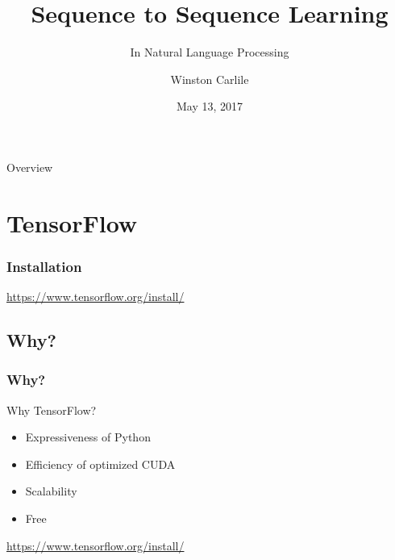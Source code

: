 \documentclass[pdf]{beamer}
\title{Sequence to Sequence Learning}
\subtitle{In Natural Language Processing}
\date{May 13, 2017}
\author{Winston Carlile}
\institute{wjc140030@utdallas.edu}
\begin{document}
\begin{frame}
  \titlepage
\end{frame}

\begin{frame}{Overview}
  \tableofcontents
\end{frame}
\section{TensorFlow}

\begin{frame}
  \frametitle{Installation}
  \url{https://www.tensorflow.org/install/}
\end{frame}

\subsection{Why?}
\begin{frame}
  \frametitle{Why?}
  Why TensorFlow?
  \begin{itemize}
  \item Expressiveness of Python
  \item Efficiency of optimized CUDA
  \item Scalability\pause
  \item Free \smiley
  \end{itemize}
  \pause
  \url{https://www.tensorflow.org/install/}
\end{frame}
\end{document}
